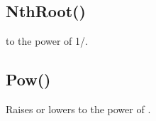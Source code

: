 \documentclass[letterpaper,10pt,english]{sphinxmanual}
\begin{document}
\begin{sphinxVerbatim}[commandchars=\\\{\}]
\end{sphinxVerbatim}

\sphinxAtStartPar
{}

\sphinxAtStartPar
{}


\subsection{NthRoot()}
\label{\detokenize{reference/peblmath:nthroot}}
\sphinxAtStartPar
{}

\sphinxAtStartPar
{} to the power of  1/.

\sphinxAtStartPar
{}

\begin{sphinxVerbatim}[commandchars=\\\{\}]
\end{sphinxVerbatim}


\subsection{Pow()}
\label{\detokenize{reference/peblmath:pow}}
\sphinxAtStartPar
{}

\sphinxAtStartPar
Raises or lowers  to the power of .

\sphinxAtStartPar
{}

\begin{sphinxVerbatim}[commandchars=\\\{\}]
\end{sphinxVerbatim}
\end{document}
